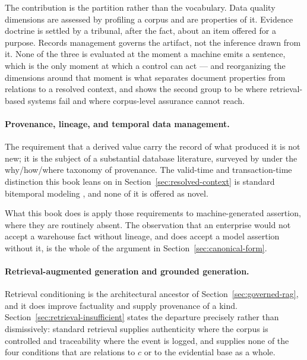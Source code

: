 The contribution is the partition rather than the vocabulary. Data quality
dimensions are assessed by profiling a corpus and are properties of it. Evidence
doctrine is settled by a tribunal, after the fact, about an item offered for a
purpose. Records management governs the artifact, not the inference drawn from it.
None of the three is evaluated at the moment a machine emits a sentence, which is
the only moment at which a control can act --- and reorganizing the dimensions
around that moment is what separates document properties from relations to a
resolved context, and shows the second group to be where retrieval-based systems
fail and where corpus-level assurance cannot reach.


\paragraph{Provenance, lineage, and temporal data management.} The requirement that a
derived value carry the record of what produced it is not new; it is the subject of a
substantial database literature, surveyed by \citet{cheney2009} under the
why/how/where taxonomy of provenance. The valid-time and transaction-time distinction
this book leans on in Section~\ref{sec:resolved-context} is standard bitemporal
modeling \citep{snodgrass1999}, and none of it is offered as novel.

What this book does is apply those requirements to machine-generated assertion, where
they are routinely absent. The observation that an enterprise would not accept a
warehouse fact without lineage, and does accept a model assertion without it, is the
whole of the argument in Section~\ref{sec:canonical-form}.

\paragraph{Retrieval-augmented generation and grounded generation.} Retrieval
conditioning \citep{lewis2020} is the architectural ancestor of
Section~\ref{sec:governed-rag}, and it does improve factuality and supply provenance
of a kind. Section~\ref{sec:retrieval-insufficient} states the departure precisely
rather than dismissively: standard retrieval supplies authenticity where the corpus is
controlled and traceability where the event is logged, and supplies none of the four
conditions that are relations to $c$ or to the evidential base as a whole.


